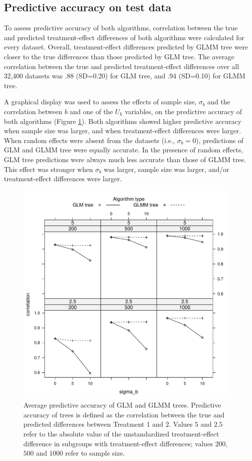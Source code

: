 \documentclass[nobf,doc]{apa}
\begin{document}
\subsection{Predictive accuracy on test data}

To assess predictive accuracy of both algorithms, correlation between the true and predicted treatment-effect differences of both algorithms were calculated for every dataset. Overall, treatment-effect differences predicted by GLMM tree were closer to the true differences than those predicted by GLM tree. The average correlation between the true and predicted treatment-effect differences over all 32,400 datasets was .88 (SD=0.20) for GLM tree, and .94 (SD=0.10) for GLMM tree.

A graphical display was used to assess the effects of sample size, $\sigma_b$ and the correlation between $b$ and one of the $U_k$ variables, on the predictive accuracy of both algorithms (Figure \ref{fig:xyplot_correlations}). Both algorithms showed higher predictive accuracy when sample size was larger, and when treatment-effect differences were larger. When random effects were absent from the datasets (i.e., $\sigma_b = 0$), predictions of GLM and GLMM tree were equally accurate. In the presence of random effects, GLM tree predictions were always much less accurate than those of GLMM tree. This effect was stronger when $\sigma_b$ was larger, sample size was larger, and/or treatment-effect differences were larger.

\begin{figure}[!htbp]
	\includegraphics[width=12cm]{xy_correlations.pdf}
	\caption{Average predictive accuracy of GLM and GLMM trees. Predictive accuracy of trees is defined as the correlation between the true and predicted differences between Treatment 1 and 2. Values $5$ and $2.5$ refer to the absolute value of the unstandardized treatment-effect difference in subgroups with treatment-effect differences; values $200$, $500$ and $1000$ refer to sample size.}
	\label{fig:xyplot_correlations}
\end{figure}
\end{document}
